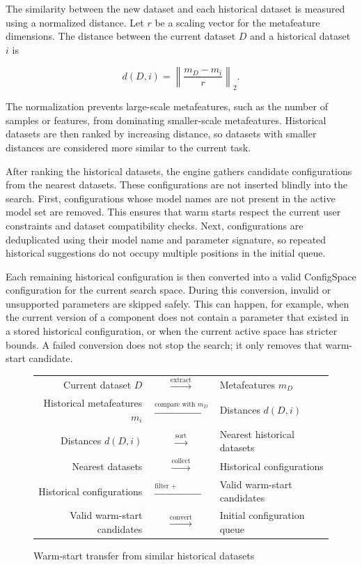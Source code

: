 \documentclass[12pt,a4paper]{report}
\begin{document}
\noindent The similarity between the new dataset and each historical dataset is measured
using a normalized distance. Let \(r\) be a scaling vector for the metafeature
dimensions. The distance between the current dataset \(D\) and a historical
dataset \(i\) is

\[
d(D,i) =
\left\|
\frac{m_D - m_i}{r}
\right\|_2 .
\]

\noindent The normalization prevents large-scale metafeatures, such as the number of
samples or features, from dominating smaller-scale metafeatures. Historical
datasets are then ranked by increasing distance, so datasets with smaller
distances are considered more similar to the current task.

\noindent After ranking the historical datasets, the engine gathers candidate
configurations from the nearest datasets. These configurations are not inserted
blindly into the search. First, configurations whose model names are not present
in the active model set are removed. This ensures that warm starts respect the
current user constraints and dataset compatibility checks. Next, configurations
are deduplicated using their model name and parameter signature, so repeated
historical suggestions do not occupy multiple positions in the initial queue.

\noindent Each remaining historical configuration is then converted into a valid
ConfigSpace configuration for the current search space. During this conversion,
invalid or unsupported parameters are skipped safely. This can happen, for
example, when the current version of a component does not contain a parameter
that existed in a stored historical configuration, or when the current active
space has stricter bounds. A failed conversion does not stop the search; it only
removes that warm-start candidate.

\begin{figure}[H]
\centering
\renewcommand{\arraystretch}{1.25}
\begin{tabular}{rcl}
Current dataset \(D\)
& \(\xrightarrow{\text{extract}}\) &
Metafeatures \(m_D\) \\

Historical metafeatures \(m_i\)
& \(\xrightarrow{\text{compare with } m_D}\) &
Distances \(d(D,i)\) \\

Distances \(d(D,i)\)
& \(\xrightarrow{\text{sort}}\) &
Nearest historical datasets \\

Nearest datasets
& \(\xrightarrow{\text{collect}}\) &
Historical configurations \\

Historical configurations
& \(\xrightarrow{\text{filter + deduplicate}}\) &
Valid warm-start candidates \\

Valid warm-start candidates
& \(\xrightarrow{\text{convert}}\) &
Initial configuration queue \\
\end{tabular}
\caption{Warm-start transfer from similar historical datasets}
\label{fig:gp-automl-warm-start-transfer}
\end{figure}
\end{document}

